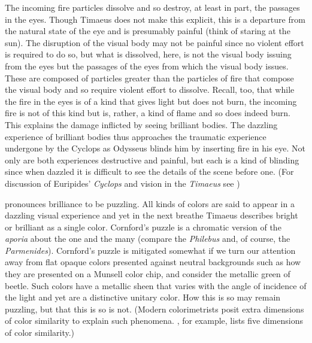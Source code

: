 The incoming fire particles dissolve and so destroy, at least in part, the passages in the eyes. Though Timaeus does not make this explicit, this is a departure from the natural state of the eye and is presumably painful (think of staring at the sun). The disruption of the visual body may not be painful since no violent effort is required to do so, but what is dissolved, here, is not the visual body issuing from the eyes but the passages of the eyes from which the visual body issues. These are composed of particles greater than the particles of fire that compose the visual body and so require violent effort to dissolve. Recall, too, that while the fire in the eyes is of a kind that gives light but does not burn, the incoming fire is not of this kind but is, rather, a kind of flame and so does indeed burn. This explains the damage inflicted by seeing brilliant bodies. The dazzling experience of brilliant bodies thus approaches the traumatic experience undergone by the Cyclops as Odysseus blinds him by inserting fire in his eye. Not only are both experiences destructive and painful, but each is a kind of blinding since when dazzled it is difficult to see the details of the scene before one. (For discussion of Euripides' \emph{Cyclops} and vision in the \emph{Timaeus} see \citealt[114]{Johansen:2004dx})

\citet[277--8]{Cornford:1935fk} pronounces brilliance to be puzzling. All kinds of colors are said to appear in a dazzling visual experience and yet in the next breathe Timaeus describes bright or brilliant as a single color. Cornford's puzzle is a chromatic version of the \emph{aporia} about the one and the many (compare the \emph{Philebus} and, of course, the \emph{Parmenides}). Cornford's puzzle is mitigated somewhat if we turn our attention away from flat opaque colors presented against neutral backgrounds such as how they are presented on a Munsell color chip, and consider the metallic green of beetle. Such colors have a metallic sheen that varies with the angle of incidence of the light and yet are a distinctive unitary color. How this is so may remain puzzling, but that this is so is not. (Modern colorimetrists posit extra dimensions of color similarity to explain such phenomena. \citealt{Fairchild:2005vd}, for example, lists five dimensions of color similarity.)

